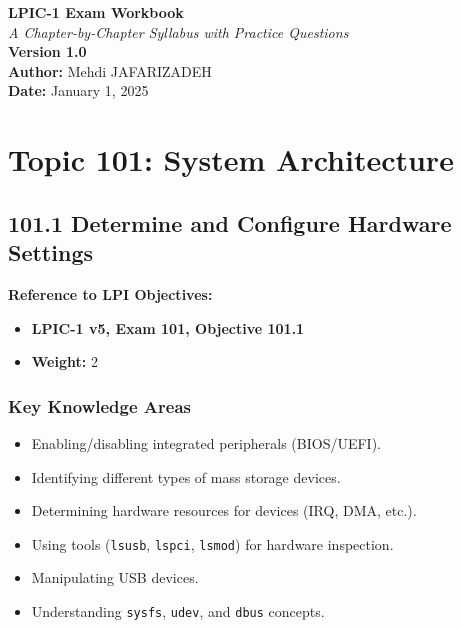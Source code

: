 \documentclass[12pt,a4paper]{report}
\begin{document}
\begin{titlepage}
    \centering
    \vspace*{3cm}
    {\Huge \textbf{LPIC-1 Exam Workbook}}\\
    \vspace{1cm}
    {\large \textit{A Chapter-by-Chapter Syllabus with Practice Questions}}\\
    \vfill
    {\large \textbf{Version 1.0}}\\
    \vspace{2cm}
    \vfill
    \textbf{Author:} Mehdi JAFARIZADEH \\
    \textbf{Date:} January 1, 2025
    \vspace{2cm}
\end{titlepage}

\tableofcontents
\newpage

\chapter{Topic 101: System Architecture}


\section*{101.1 Determine and Configure Hardware Settings}

\textbf{Reference to LPI Objectives:}  
\begin{itemize}
    \item \textbf{LPIC-1 v5, Exam 101, Objective 101.1}
    \item \textbf{Weight:} 2
\end{itemize}

\subsection*{Key Knowledge Areas}
\begin{itemize}
    \item Enabling/disabling integrated peripherals (BIOS/UEFI).
    \item Identifying different types of mass storage devices.
    \item Determining hardware resources for devices (IRQ, DMA, etc.).
    \item Using tools (\texttt{lsusb}, \texttt{lspci}, \texttt{lsmod}) for hardware inspection.
    \item Manipulating USB devices.
    \item Understanding \texttt{sysfs}, \texttt{udev}, and \texttt{dbus} concepts.
\end{itemize}
\end{document}
